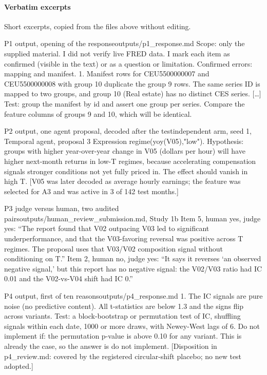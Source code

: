 \documentclass[11pt,letterpaper]{article}
\begin{document}
\paragraph{Verbatim excerpts} Short excerpts, copied from the files above without editing.
\begin{promptbox}{P1 output, opening of the response}{outputs/p1\_response.md}
Scope: only the supplied material. I did not verify live FRED data. I mark each item as confirmed (visible in the text) or as a question or limitation. Confirmed errors: mapping and manifest. 1. Manifest rows for CEU5500000007 and CEU5500000008 with group 10 duplicate the group 9 rows. The same series ID is mapped to two groups, and group 10 (Real estate) has no distinct CES series. [\ldots] Test: group the manifest by id and assert one group per series. Compare the feature columns of groups 9 and 10, which will be identical.
\end{promptbox}
\begin{promptbox}{P2 output, one agent proposal, decoded after the test}{independent arm, seed 1, Temporal agent, proposal 3}
Expression regime(yoy(V05),"low"). Hypothesis: groups with higher year-over-year change in V05 (dollars per hour) will have higher next-month returns in low-T regimes, because accelerating compensation signals stronger conditions not yet fully priced in. The effect should vanish in high T. [V05 was later decoded as average hourly earnings; the feature was selected for A3 and was active in 3 of 142 test months.]
\end{promptbox}
\begin{promptbox}{P3 judge versus human, two audited pairs}{outputs/human\_review\_submission.md, Study 1b}
Item 5, human yes, judge yes: ``The report found that V02 outpacing V03 led to significant underperformance, and that the V03-favoring reversal was positive across T regimes. The proposal uses that V03/V02 composition signal without conditioning on T.'' Item 2, human no, judge yes: ``It says it reverses `an observed negative signal,' but this report has no negative signal: the V02/V03 ratio had IC 0.01 and the V02-vs-V04 shift had IC 0.''
\end{promptbox}
\begin{promptbox}{P4 output, first of ten reasons}{outputs/p4\_response.md}
1. The IC signals are pure noise (no predictive content). All t-statistics are below 1.3 and the signs flip across variants. Test: a block-bootstrap or permutation test of IC, shuffling signals within each date, 1000 or more draws, with Newey-West lags of 6. Do not implement if: the permutation p-value is above 0.10 for any variant. This is already the case, so the answer is do not implement. [Disposition in p4\_review.md: covered by the registered circular-shift placebo; no new test adopted.]
\end{promptbox}
\end{document}

